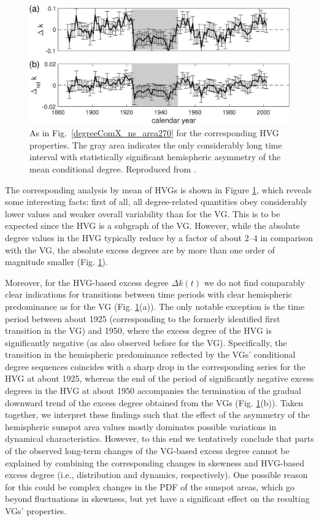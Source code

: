 \begin{figure}
	\centering
	\includegraphics[width=0.9\columnwidth]{Chapter07_Applications/north_southDegreeComXWin130HVGP.eps}
\caption{\small {As in Fig.~\ref{degreeComX_ns_area270} for the corresponding HVG properties. The gray area indicates the only considerably long time interval with statistically significant hemispheric asymmetry of the mean conditional degree. Reproduced from \cite{Zou2014}. }
\label{HVG}}
\end{figure}		
		
		The corresponding analysis by mean of HVGs is shown in Figure \ref{HVG}, which reveals some interesting facts: first of all, all degree-related quantities obey considerably lower values and weaker overall variability than for the VG. This is to be expected since the HVG is a subgraph of the VG. However, while the absolute degree values in the HVG typically reduce by a factor of about 2--4 in comparison with the VG, the absolute excess degrees are by more than one order of magnitude smaller (Fig. \ref{HVG}). 

		Moreover, for the HVG-based excess degree $\Delta k(t)$ we do not find comparably clear indications for transitions between time periods with clear hemispheric predominance as for the VG (Fig. \ref{HVG}(a)). The only notable exception is the time period between about 1925 (corresponding to the formerly identified first transition in the VG) and 1950, where the excess degree of the HVG is significantly negative (as also observed before for the VG). Specifically, the transition in the hemispheric predominance reflected by the VGs' conditional degree sequences coincides with a sharp drop in the corresponding series for the HVG at about 1925, whereas the end of the period of significantly negative excess degrees in the HVG at about 1950 accompanies the termination of the gradual downward trend of the excess degree obtained from the VGs (Fig. \ref{HVG}(b)). Taken together, we interpret these findings such that the effect of the asymmetry of the hemispheric sunspot area values mostly dominates possible variations in dynamical characteristics. However, to this end we tentatively conclude that parts of the observed long-term changes of the VG-based excess degree cannot be explained by combining the corresponding changes in skewness and HVG-based excess degree (i.e., distribution and dynamics, respectively). One possible reason for this could be complex changes in the PDF of the sunspot areas, which go beyond fluctuations in skewness, but yet have a significant effect on the resulting VGs' properties.
		
